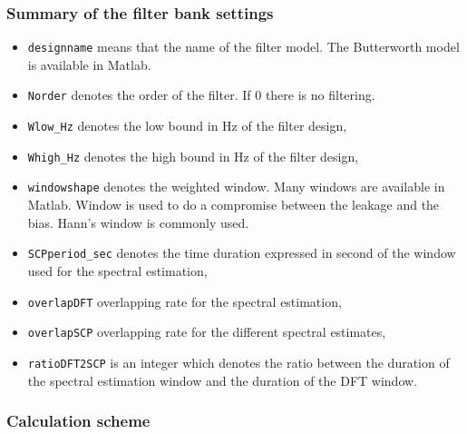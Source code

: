 \subsubsection{Summary of the filter bank settings}

\label{sss:filter-bank-settings}

\begin{center}
{\tiny}
\end{center}

\begin{itemize}
\item
{\tt designname} means that the name of the filter model. The Butterworth model is available in Matlab. 
\item
{\tt Norder} denotes the order of the filter. If 0 there is no filtering. 
\item
{\tt Wlow\_Hz} denotes the low bound in Hz of the filter design,
\item
{\tt Whigh\_Hz} denotes the high bound in Hz of the filter design,
\item
{\tt windowshape} denotes the weighted window. Many windows are available in Matlab. Window is used to do a compromise between the leakage and the bias. Hann's window is commonly used.
\item
{\tt SCPperiod\_sec} denotes the time duration expressed in second of the window used for the spectral estimation,
\item
{\tt overlapDFT} overlapping rate for the spectral estimation,
\item
{\tt overlapSCP} overlapping rate for the different spectral estimates,
\item
{\tt ratioDFT2SCP} is an integer which denotes the ratio between the duration of the spectral estimation window and the duration of the DFT window. 

\end{itemize}

\newpage\clearpage

\subsubsection{Calculation scheme}

